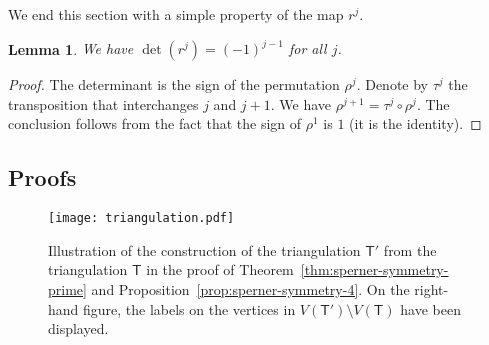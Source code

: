 \documentclass[12pt]{amsart}
\newtheorem{lemma}{Lemma}
\theoremstyle{definition}
\theoremstyle{remark}
\newtheorem*{remark}{Remark}
\def\T{\mathsf{T}}
\def\det{\operatorname{det}}
\def\blue{\color{blue}}
\begin{document}


We end this section with a simple property of the map $r^j$.

\begin{lemma}\label{lem:detr}
We have $\det(r^j)=(-1)^{j-1}$ for all $j$.
\end{lemma}

\begin{proof}
The determinant is the sign of the permutation $\rho^j$. Denote by $\tau^j$ the transposition that interchanges $j$ and $j+1$. We have $\rho^{j+1}=\tau^j\circ\rho^j$. The conclusion follows from the fact that the sign of $\rho^1$ is $1$ (it is the identity).
\end{proof}

\subsection{Proofs}

\begin{figure}
\begin{center}
\texttt{[image: triangulation.pdf]}
\caption{Illustration of the construction of the triangulation $\T'$ from the triangulation $\T$ in the proof of Theorem~\ref{thm:sperner-symmetry-prime} and Proposition~\ref{prop:sperner-symmetry-4}. On the right-hand figure, the labels on the vertices in $V(\T')\setminus V(\T)$ have been displayed.}
\label{fig:triangulation}
\end{center}
\end{figure}
\end{document}
